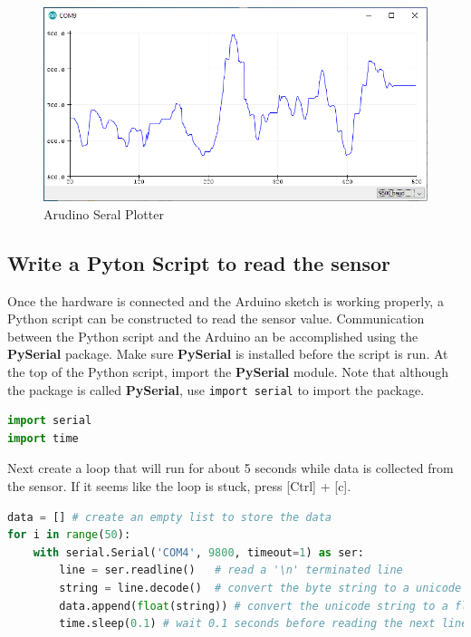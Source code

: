 \documentclass{book}
\makeatletter
\def\maxwidth{\ifdim\Gin@nat@width>\linewidth\linewidth
    \else\Gin@nat@width\fi}
\let\Oldincludegraphics\includegraphics
\renewcommand{\includegraphics}[1]{\Oldincludegraphics[width=.8\maxwidth]{#1}}
\makeatother
\begin{document}
\begin{figure}
\centering
\includegraphics{images/serial_plotter_output.png}
\caption{Arudino Seral Plotter}
\end{figure}

    \subsection{Write a Pyton Script to read the
sensor}\label{write-a-pyton-script-to-read-the-sensor}

    Once the hardware is connected and the Arduino sketch is working
properly, a Python script can be constructed to read the sensor value.
Communication between the Python script and the Arduino an be
accomplished using the \textbf{PySerial} package. Make sure
\textbf{PySerial} is installed before the script is run. At the top of
the Python script, import the \textbf{PySerial} module. Note that
although the package is called \textbf{PySerial}, use
\lstinline!import serial! to import the package.

    \begin{lstlisting}[language=Python]
import serial
import time
\end{lstlisting}

    Next create a loop that will run for about 5 seconds while data is
collected from the sensor. If it seems like the loop is stuck, press
{[}Ctrl{]} + {[}c{]}.

    \begin{lstlisting}[language=Python]
data = [] # create an empty list to store the data
for i in range(50):
    with serial.Serial('COM4', 9800, timeout=1) as ser:
        line = ser.readline()   # read a '\n' terminated line
        string = line.decode()  # convert the byte string to a unicode string
        data.append(float(string)) # convert the unicode string to a float and add to the data list
        time.sleep(0.1) # wait 0.1 seconds before reading the next line
\end{lstlisting}
\end{document}
